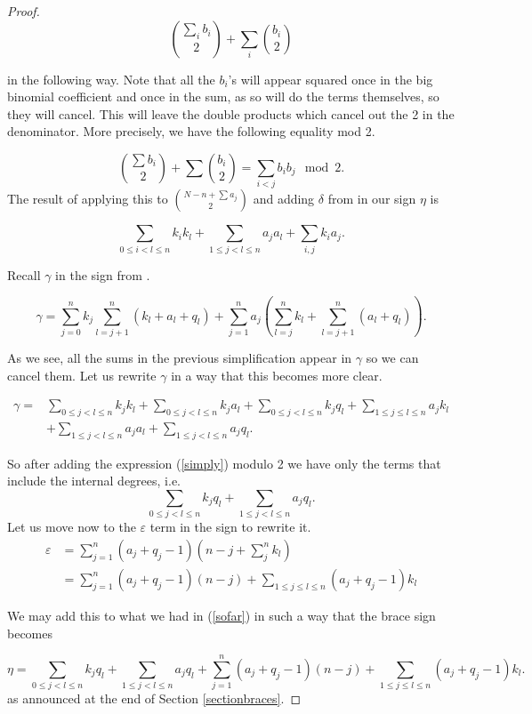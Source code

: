 \documentclass[Thesis.tex]{subfiles}
\begin{document}
\begin{proof}
\[\binom{\sum_i b_i}{2}+\sum_i\binom{b_i}{2}\]

in the following way. Note that all the $b_i$'s will appear squared once in the big binomial coefficient and once in the sum, as so will do the terms themselves, so they will cancel. This will leave the double products which cancel out the 2 in the denominator. More precisely, we have the following equality mod 2.

\[\binom{\sum b_i}{2}+\sum\binom{b_i}{2}=\sum_{i<j}b_ib_j\mod 2.\]
The result of applying this to $\binom{N-n+\sum a_j}{2}$ and adding $\delta$ from  in our sign $\eta$ is

\begin{equation}\label{simply}
\sum_{0\leq i<l\leq n}k_ik_l+\sum_{1\leq j<l\leq n}a_ja_l+\sum_{i,j}k_ia_j.
\end{equation}

Recall $\gamma$ in the sign from .

\begin{equation*}\label{gamma}
\gamma= \sum_{j=0}^nk_j\sum_{l=j+1}^n(k_l+a_l+q_l)+\sum_{j=1}^na_j\left(\sum_{l=j}^nk_l+\sum_{l=j+1}^n(a_l+q_l)\right).
\end{equation*}

As we see, all the sums in the previous simplification appear in $\gamma$ so we can cancel them. Let us rewrite $\gamma$ in a way that this becomes more clear.

\begin{align*}
\gamma =& \sum_{0\leq j<l\leq n}k_jk_l+\sum_{0\leq j<l\leq n}k_ja_l+\sum_{0\leq j<l\leq n}k_jq_l+\sum_{1\leq j\leq l\leq n}a_jk_l\\
&+\sum_{1\leq j<l\leq n}a_ja_l+\sum_{1\leq j<l\leq n}a_jq_l.
\end{align*}

So after adding the expression (\ref{simply}) modulo 2 we have only the terms that include the internal degrees, i.e.
\begin{equation}\label{sofar}
\sum_{0\leq j<l\leq n}k_jq_l+\sum_{1\leq j<l\leq n}a_jq_l.
\end{equation}
Let us move now to the $\varepsilon$ term in the sign to rewrite it. 
\begin{align*}
\varepsilon&=\sum_{j=1}^n (a_j+q_j-1)(n-j+\sum_j^n k_l)\\
&=\sum_{j=1}^n (a_j+q_j-1)(n-j)+\sum_{1\leq j\leq l\leq n} (a_j+q_j-1)k_l
\end{align*}

We may add this to what we had in (\ref{sofar}) in such a way that the brace sign becomes

\begin{equation}\label{eta}
\eta=\sum_{0\leq j<l\leq n}k_jq_l+\sum_{1\leq j<l\leq n}a_jq_l+\sum_{j=1}^n (a_j+q_j-1)(n-j)+\sum_{1\leq j\leq l\leq n} (a_j+q_j-1)k_l.
\end{equation}
as announced at the end of Section \ref{sectionbraces}.
\end{proof}
\end{document}
